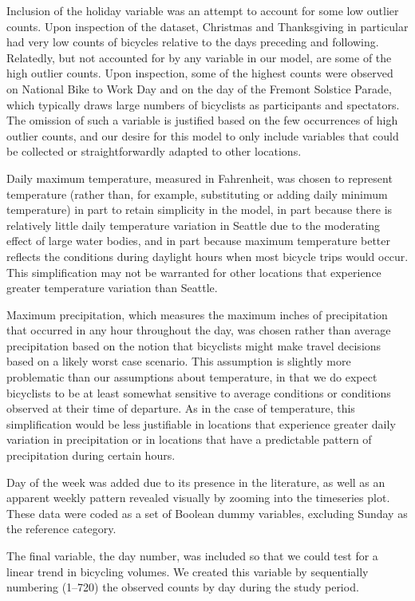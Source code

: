 \documentclass[12pt,letterpaper,article,twocolumn]{memoir}
\begin{document}
Inclusion of the holiday variable was an attempt to account for
some low outlier counts. Upon inspection of the dataset, Christmas and
Thanksgiving in particular had very low counts of bicycles relative to
the days preceding and following. Relatedly, but not accounted for by
any variable in our model, are some of the high outlier counts. Upon
inspection, some of the highest counts were observed on National Bike
to Work Day and on the day of the Fremont Solstice Parade, which
typically draws large numbers of bicyclists as participants and
spectators. The omission of such a variable is justified based on the
few occurrences of high outlier counts, and our desire for this model
to only include variables that could be collected or straightforwardly
adapted to other locations.

Daily maximum temperature, measured in Fahrenheit, was chosen to
represent temperature (rather than, for example, substituting or
adding daily minimum temperature) in part to retain simplicity in the
model, in part because there is relatively little daily temperature
variation in Seattle due to the moderating effect of large water
bodies, and in part because maximum temperature better reflects the
conditions during daylight hours when most bicycle trips would occur.
This simplification may not be warranted for other locations that
experience greater temperature variation than Seattle.

Maximum precipitation, which measures the maximum inches of
precipitation that occurred in any hour throughout the day, was chosen
rather than average precipitation based on the notion that bicyclists
might make travel decisions based on a likely worst case scenario.
This assumption is slightly more problematic than our assumptions
about temperature, in that we do expect bicyclists to be at least
somewhat sensitive to average conditions or conditions observed at
their time of departure. As in the case of temperature, this
simplification would be less justifiable in locations that experience
greater daily variation in precipitation or in locations that have a
predictable pattern of precipitation during certain hours.

Day of the week was added due to its presence in the literature, as
well as an apparent weekly pattern revealed visually by zooming into
the timeseries plot. These data were coded as a set of Boolean dummy
variables, excluding Sunday as the reference category.

The final variable, the day number, was included so that we could test
for a linear trend in bicycling volumes. We created this variable by
sequentially numbering (1--720) the observed counts by day during the
study period.
\end{document}

